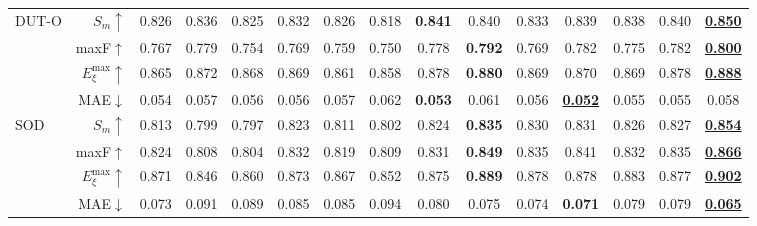 \documentclass[10pt,twocolumn,letterpaper]{article}
\def\blu#1{\textbf{\color{blue} #1}} \def\red#1{\textbf{\color{red}\underline{#1}}}
\begin{document}
\begin{table*}[t]
\begin{tabular}{lr|cccccccccccc|c}
  \multirow{4}{*}{DUT-O}
    & $S_m\uparrow$  &0.826 &0.836 &0.825 &0.832 &0.826 &0.818 &\blu{0.841} &0.840 &0.833 &0.839 &0.838 &0.840 &\red{0.850} \\
    & maxF$\uparrow$  &0.767 &0.779 &0.754 &0.769 &0.759 &0.750 &0.778 &\blu{0.792} &0.769 &0.782 &0.775 &0.782 &\red{0.800}\\
    & $E_{\xi}^{\text{max}}\uparrow$ &0.865 &0.872 &0.868 &0.869 &0.861 &0.858 &0.878 &\blu{0.880} &0.869 &0.870 &0.869 &0.878 &\red{0.888}\\
    \cite{yang2013DUTO} & MAE$\downarrow$ &0.054 &0.057 &0.056 &0.056 &0.057 &0.062 &\blu{0.053} &0.061 &0.056 &\red{0.052} &0.055 &0.055 &0.058\\
     \hline

  \multirow{4}{*}{SOD}
    & $S_m\uparrow$   &0.813 &0.799 &0.797 &0.823 &0.811 &0.802 &0.824 &\blu{0.835} &0.830 &0.831 &0.826 &0.827 &\red{0.854} \\
    & maxF$\uparrow$  &0.824 &0.808 &0.804 &0.832 &0.819 &0.809 &0.831 &\blu{0.849} &0.835 &0.841 &0.832 &0.835 &\red{0.866} \\
    & $E_{\xi}^{\text{max}}\uparrow$  &0.871 &0.846 &0.860 &0.873 &0.867 &0.852 &0.875 &\blu{0.889} &0.878 &0.878 &0.883 &0.877 &\red{0.902}\\
    \cite{movahedi2010SOD}& MAE$\downarrow$  &0.073 &0.091 &0.089 &0.085 &0.085 &0.094 &0.080 &0.075 &0.074 &\blu{0.071} &0.079 &0.079 &\red{0.065}\\
     \hline

  \end{tabular}
  \label{RGB_SOTA}
\end{table*}
\end{document}
